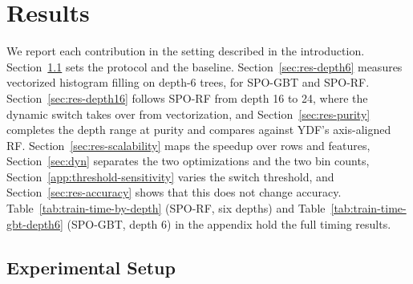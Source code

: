 \documentclass[sigconf,anonymous,review]{acmart}
\begin{document}




\section{Results}
\label{sec:results}


We report each contribution in the setting described in the introduction. Section~\ref{app:parameters} sets the protocol and the baseline. Section~\ref{sec:res-depth6} measures vectorized histogram filling on depth-6 trees, for SPO-GBT and SPO-RF. Section~\ref{sec:res-depth16} follows SPO-RF from depth 16 to 24, where the dynamic switch takes over from vectorization, and Section~\ref{sec:res-purity} completes the depth range at purity and compares against YDF's axis-aligned RF. Section~\ref{sec:res-scalability} maps the speedup over rows and features, Section~\ref{sec:dyn} separates the two optimizations and the two bin counts, Section~\ref{app:threshold-sensitivity} varies the switch threshold, and Section~\ref{sec:res-accuracy} shows that this does not change accuracy. Table~\ref{tab:train-time-by-depth} (SPO-RF, six depths) and Table~\ref{tab:train-time-gbt-depth6} (SPO-GBT, depth 6) in the appendix hold the full timing results.

\subsection{Experimental Setup}
\label{app:parameters}
\end{document}
